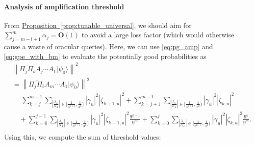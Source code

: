 \documentclass[letterpaper,onecolumn,11pt,accepted=2026-02-14]{quantumarticle}
\newcommand{\abs}[1]{\left\lvert#1\right\rvert}
\newcommand{\norm}[1]{\left\lVert#1\right\rVert}
\theoremstyle{remark}
\theoremstyle{plain}
\newcommand{\eq}[1]{\cref{eq:#1}}
\newcommand{\prop}[1]{\hyperref[prop:#1]{Proposition~\ref*{prop:#1}}}
\newcommand{\ket}[1]{|#1\rangle}
\begin{document}
\paragraph{Analysis of amplification threshold}
From \prop{tunable_universal}, we should aim for $\sum_{j=m-l+1}^m\alpha_j=\mathbf{O}(1)$ to avoid a large loss factor (which would otherwise cause a waste of oracular queries). Here, we can use \eq{pg_amp} and \eq{gpe_with_bm} to evaluate the potentially good probabilities as
\begin{equation}
\begin{aligned}
    &\norm{\overline{\Pi_{j}\Pi_b}A_{j}\cdots A_1\ket{\psi_0}}^2\\
    &=\norm{\overline{\Pi_{j}\Pi_b}A_{m}\cdots A_1\ket{\psi_0}}^2\\
    &=\sum_{k=j}^{m-1}\sum_{\abs{\frac{\lambda_u}{\alpha_A}}\in\big[\frac{1}{3^{k+1}},\frac{1}{3^k}\big)}\abs{\gamma_u}^2\abs{\zeta_{k+1,u}}^2
    +\sum_{k=j+1}^{m-1}\sum_{\abs{\frac{\lambda_u}{\alpha_A}}\in\big[\frac{1}{3^{k+1}},\frac{1}{3^k}\big)}\abs{\gamma_u}^2\abs{\zeta_{k,u}}^2\\
    &\quad+\sum_{k=0}^{j-1}\sum_{\abs{\frac{\lambda_u}{\alpha_A}}\in\big[\frac{1}{3^{k+1}},\frac{1}{3^k}\big)}\abs{\gamma_u}^2\abs{\zeta_{k+1,u}}^2\frac{9^{k+1}}{9^m}
    +\sum_{k=0}^{j}\sum_{\abs{\frac{\lambda_u}{\alpha_A}}\in\big[\frac{1}{3^{k+1}},\frac{1}{3^k}\big)}\abs{\gamma_u}^2\abs{\zeta_{k,u}}^2\frac{9^k}{9^m}.\\
\end{aligned}
\end{equation}
Using this, we compute the sum of threshold values:
\end{document}
